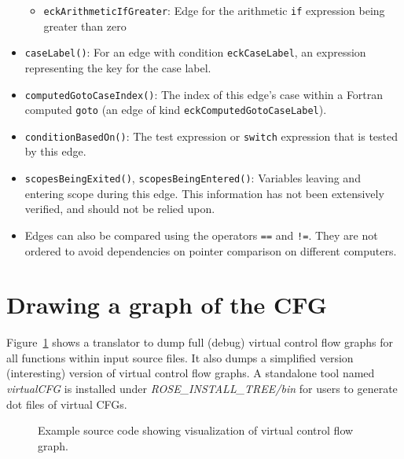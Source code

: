 \begin{itemize}
\begin{itemize}
  \item \lstinline{eckArithmeticIfGreater}: Edge for the arithmetic \lstinline{if} expression being greater than zero
  \end{itemize}
\item \lstinline{caseLabel()}: For an edge with condition
      \lstinline{eckCaseLabel}, an expression representing the key for the case
      label.
\item \lstinline{computedGotoCaseIndex()}: The index of this edge's case
      within a Fortran computed \lstinline{goto} (an edge of kind
      \lstinline{eckComputedGotoCaseLabel}).
\item \lstinline{conditionBasedOn()}: The test expression or
      \lstinline{switch} expression that is tested by this edge.
\item \lstinline{scopesBeingExited()}, \lstinline{scopesBeingEntered()}:
      Variables leaving and entering scope during this edge.  This information
      has not been extensively verified, and should not be relied upon.
\item Edges can also be compared using the operators \lstinline{==} and
      \lstinline{!=}.  They are not ordered to avoid dependencies on pointer
      comparison on different computers.
\end{itemize}

\section{Drawing a graph of the CFG}
Figure~\ref{Tutorial:BuildVirtualCFG} shows a translator to dump 
full (debug) virtual control flow graphs for all functions within input
source files. It also dumps a simplified version (interesting) version of 
virtual control flow graphs. A standalone tool named \textit{virtualCFG} is
installed under \textit{ROSE\_INSTALL\_TREE/bin} for users to generate dot
files of virtual CFGs. 

\begin{figure}[!h]
{\indent
  {\mySmallFontSize
    \begin{latexonly}
    
    \end{latexonly}

    \begin{htmlonly}
    
    \end{htmlonly}

  }
}
\label{Tutorial:BuildVirtualCFG}
\caption{Example source code showing visualization of virtual control flow graph.}
\end{figure}



